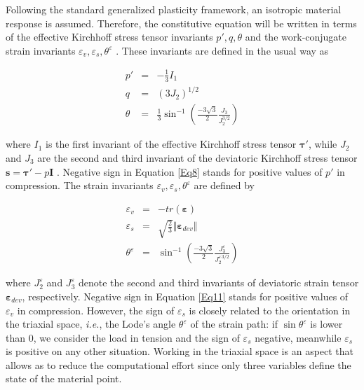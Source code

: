 \documentclass[preprint,12pt,a4paper]{elsarticle}
\begin{document}
Following the standard generalized plasticity framework, an isotropic material response is assumed. Therefore, the constitutive equation will be written in terms of the effective Kirchhoff stress tensor invariants  $p', q, \theta $ and the work-conjugate strain invariants $\varepsilon_v, \varepsilon_s, \theta^{\varepsilon}$ . These invariants are defined in the usual way as

\begin{eqnarray}
p' &=&-\frac{1}{3}I_1 \label{Eq8}\\ 
q &=&(3J_2)^{1/2}\label{Eq9} \\
\theta &=& \frac{1}{3} \sin^{-1}\left(\frac{-3\sqrt{3}}{2}\frac{J_3}{J_2^{3/2}}\right)\label{Eq10} 
\end{eqnarray}

where $I_1$ is the first invariant of the effective Kirchhoff stress tensor $\boldsymbol{\tau}'$,  while $J_2$ and $J_3$ are the second and third invariant of the deviatoric Kirchhoff stress tensor $\boldsymbol{s}=\boldsymbol{\tau}'-p\boldsymbol{I}$ . Negative sign in Equation \eqref{Eq8} stands for positive values of $p'$ in compression. The strain invariants $\varepsilon_v, \varepsilon_s, \theta^{\varepsilon}$ are defined by


\begin{eqnarray}
\varepsilon_v &=&- tr(\boldsymbol{\varepsilon})\label{Eq11}\\ 
\varepsilon_s &=&\sqrt{\frac{2}{3}}\Vert \boldsymbol{\varepsilon}_{dev} \Vert \label{Eq12}\\ 
\theta^{\varepsilon} &=& \sin^{-1}\left(\frac{-3\sqrt{3}}{2}\frac{J^{\varepsilon}_3}{J_2^{\varepsilon \, 3/2}}\right)\label{Eq13} 
\end{eqnarray}

where $J^{\varepsilon}_2$ and $J^{\varepsilon}_3$ denote the second
and third invariants of deviatoric strain tensor $\boldsymbol{\varepsilon}_{dev}$, respectively. Negative sign in Equation \eqref{Eq11} stands for positive values of $\varepsilon_v$ in compression. However, the sign of $\varepsilon_s$ is closely related to the orientation in the triaxial space, \textit{i.e.}, the Lode's angle $\theta^{\varepsilon}$ of the strain path: if $\sin \theta^{\varepsilon}$ is lower than 0, we consider the load in tension and the sign of $\varepsilon_s$ negative, meanwhile $\varepsilon_s$ is positive on any other situation. Working in the triaxial space is an aspect that allows as to reduce the computational effort since only three variables define the state of the material point.
\end{document}
